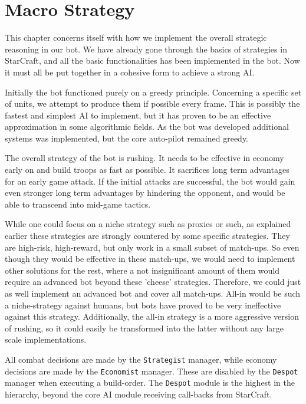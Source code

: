 \chapter{Macro Strategy}
\label{ch:strategy}
This chapter concerns itself with how we implement the overall strategic reasoning in our bot. We have already gone through the basics of strategies in StarCraft, and all the basic functionalities has been implemented in the bot. Now it must all be put together in a cohesive form to achieve a strong AI.

Initially the bot functioned purely on a greedy principle. Concerning a specific set of units, we attempt to produce them if possible every frame. This is possibly the fastest and simplest AI to implement, but it has proven to be an effective approximation in some algorithmic fields. As the bot was developed additional systems was implemented, but the core auto-pilot remained greedy.

The overall strategy of the bot is rushing. It needs to be effective in economy early on and build troops as fast as possible. It sacrifices long term advantages for an early game attack. If the initial attacks are successful, the bot would gain even stronger long term advantages by hindering the opponent, and would be able to transcend into mid-game tactics.

While one could focus on a niche strategy such as proxies or such, as explained earlier these strategies are strongly countered by some specific strategies. They are high-risk, high-reward, but only work in  a small subset of match-ups. So even though they would be effective in these match-ups, we would need to implement other solutions for the rest, where a not insignificant amount of them would require an advanced bot beyond these 'cheese' strategies. Therefore, we could just as well implement an advanced bot and cover all match-ups. All-in would be such a niche-strategy against humans, but bots have proved to be very ineffective against this strategy. Additionally, the all-in strategy is a more aggressive version of rushing, so it could easily be transformed into the latter without any large scale implementations.

All combat decisions are made by the \texttt{Strategist} manager, while economy decisions are made by the \texttt{Economist} manager. These are disabled by the \texttt{Despot} manager when executing a build-order. The \texttt{Despot} module is the highest in the hierarchy, beyond the core AI module receiving call-backs from StarCraft.

